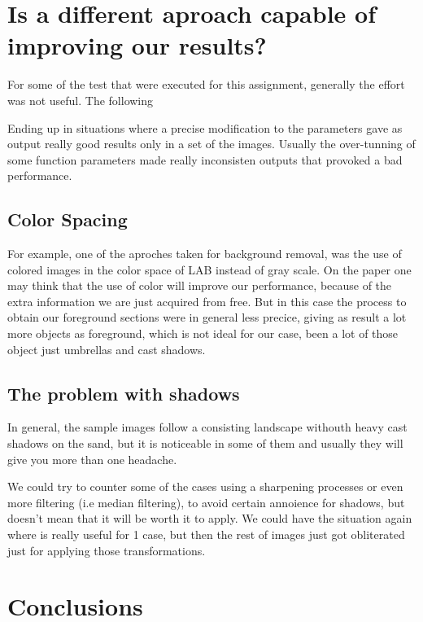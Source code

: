 \documentclass[10pt]{article}
\begin{document}
\section{Is a different aproach capable of improving our results?}

For some of the test that were executed for this assignment, generally the effort was not useful. The following  


Ending up in situations where a precise modification to the parameters gave as output really good results only in a set of the images. Usually the over-tunning of some function parameters made really inconsisten outputs that provoked a bad performance.  


\subsection*{Color Spacing}
 For example, one of the aproches taken for background removal, was the use of colored images in the color space of LAB  instead of gray scale. On the paper one may think that the use of color will improve our performance, because of the extra information we are just acquired from free. But in this case the process to obtain our foreground sections were in general less precice, giving as result a lot more objects as foreground, which is not ideal for our case, been a lot of those object just umbrellas and cast shadows.\newline

\subsection*{The problem with shadows}

In general, the sample images follow a consisting landscape withouth heavy cast shadows on the sand, but it is noticeable in some of them and usually they will give you more than one headache.\newline 

We could try to counter some of the cases using a sharpening processes or even more filtering (i.e median filtering), to avoid certain annoience for shadows, but doesn't mean that it will be worth it to apply. We could have the situation again where is really useful for 1 case, but then the rest of images just got obliterated just for applying those transformations.



\section{Conclusions}
\end{document}
